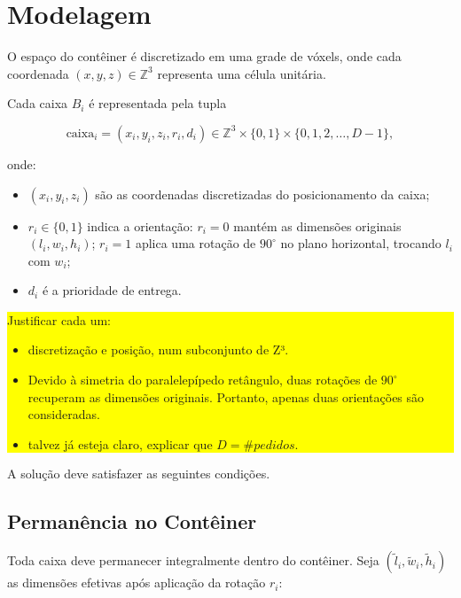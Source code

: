 \documentclass[12pt]{article}
\begin{document}
\section{Modelagem}

O espaço do contêiner é discretizado em uma grade de vóxels, onde cada coordenada $(x,y,z) \in \mathbb{Z}^3$ representa uma célula unitária.

Cada caixa $B_i$ é representada pela tupla

\[
\text{caixa}_i = (x_i, y_i, z_i, r_i, d_i) \in \mathbb{Z}^3 \times \{0,1\} \times \{0,1,2,\ldots,D-1\},
\]

onde:
\begin{itemize}
\item $(x_i, y_i, z_i)$ são as coordenadas discretizadas do posicionamento da caixa;
\item $r_i \in \{0,1\}$ indica a orientação: $r_i = 0$ mantém as dimensões originais $(l_i, w_i, h_i)$; $r_i = 1$ aplica uma rotação de $90^\circ$ no plano horizontal, trocando $l_i$ com $w_i$;
\item $d_i$ é a prioridade de entrega.
\end{itemize}


\colorbox{yellow}{%
    \begin{minipage}{0.9\linewidth}
        Justificar cada um:
        \begin{itemize}
            \item discretização e posição, num subconjunto de Z³.
            \item Devido à simetria do paralelepípedo retângulo, duas rotações de $90^\circ$ recuperam as dimensões originais. Portanto, apenas duas orientações são consideradas.
            \item talvez já esteja claro, explicar que $D=\#\textit{pedidos}$.
        \end{itemize}
    \end{minipage}%
}



A solução deve satisfazer as seguintes condições.

\subsection{Permanência no Contêiner}

Toda caixa deve permanecer integralmente dentro do contêiner. Seja $(\tilde{l}_i, \tilde{w}_i, \tilde{h}_i)$ as dimensões efetivas após aplicação da rotação $r_i$:
\end{document}
